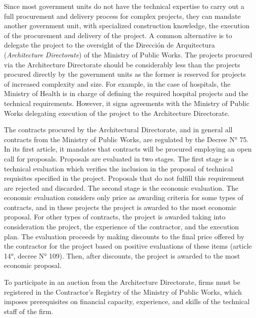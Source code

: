 \begin{enumerate}[wide, labelwidth=!,labelindent=0pt,label=\textbf{\arabic*}.]
Since most government units do not have the technical expertise to carry out a full procurement and delivery process for complex projects, they can mandate another government unit, with specialized construction knowledge, the execution of the procurement and delivery of the project. A common alternative is to delegate the project to the oversight of the Dirección de Arquitectura (\textit{Architecture Directorate}) of the Ministry of Public Works. The projects procured via the Architecture Directorate should be considerably less than the projects procured directly by the government units as the former is reserved for projects of increased complexity and size.  For example, in the case of hospitals, the Ministry of Health is in charge of defining the required hospital projects and the technical requirements. However, it signs agreements with the Ministry of Public Works delegating execution of the project to the Architecture Directorate.

The contracts procured by the Architectural Directorate, and in general all contracts from the Ministry of Public Works, are regulated by the Decree N° 75. In its first article, it mandates that contracts will be procured employing an open call for proposals. Proposals are evaluated in two stages. The first stage is a technical evaluation which verifies the inclusion in the proposal of technical requisites specified in the project. Proposals that do not fulfill this requirement are rejected and discarded. The second stage is the economic evaluation. The economic evaluation considers only price as awarding criteria for some types of contracts, and in these projects the project is awarded to the most economic proposal. For other types of contracts, the project is awarded taking into consideration the project, the experience of the contractor, and the execution plan. The evaluation proceeds by making discounts to the final price offered by the contractor for the project based on positive evaluations of these items (article 14°, decree N° 109). Then, after discounts, the project is awarded to the most economic proposal.

To participate in an auction from the Architecture Directorate, firms must be registered in the Contractor's Registry of the Ministry of Public Works, which imposes prerequisites on financial capacity, experience, and skills of the technical staff of the firm.

\end{enumerate}

